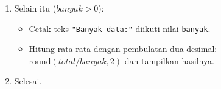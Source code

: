 \documentclass[12pt,a4paper]{article}
\begin{document}
\begin{enumerate}
\begin{enumerate}[label=\alph*.]
        \begin{itemize}
            \item Cetak pesan konfirmasi: \texttt{"Belum ada data yang dimasukkan."}.
        \end{itemize}
        \item Selain itu ($banyak > 0$):
        \begin{itemize}
            \item Cetak teks \texttt{"Banyak data:"} diikuti nilai \texttt{banyak}.
            \item Hitung rata-rata dengan pembulatan dua desimal: $\text{round}(total / banyak, 2)$ dan tampilkan hasilnya.
        \end{itemize}
        \item Selesai.
    \end{enumerate}
\end{enumerate}
\end{document}
